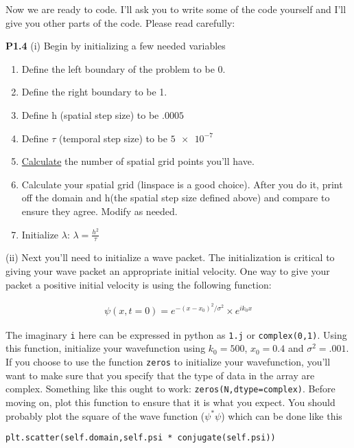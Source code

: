 Now we are ready to code.  I'll ask you to write some of the code
yourself and I'll give you other parts of the code. Please read
carefully:


\begin{minipage}{0.9\linewidth}
\noindent \textbf{P1.4} (i) Begin by initializing a few needed variables
\begin{enumerate}
\item Define the left boundary of the problem to be $0$.
\item Define the right boundary to be 1.
\item Define h (spatial step size) to be $.0005$
\item Define $\tau$ (temporal step size) to be $\num{5e-7}$
\item \underline{Calculate} the number of spatial grid points you'll
  have.
\item Calculate your spatial grid (linspace is a good choice). After
  you do it, print off the domain and h(the spatial step size defined
  above) and compare to ensure they agree.  Modify as needed.
\item Initialize $\lambda$: $\lambda = \frac{h^2}{\tau}$
\end{enumerate}
\vspace{0.1in}
(ii) Next you'll need to initialize a wave packet.  The initialization
is critical to giving your wave packet an appropriate initial
velocity.  One way to give your packet a positive initial velocity is
using the following function:

\begin{align}
\psi(x,t=0) = e^{-(x-x_0)^2/\sigma^2} \times e^{i k_0 x}
\end{align}

The imaginary \verb!i! here can be expressed in python as \verb!1.j!
or \verb!complex(0,1)!.  Using this function, initialize your
wavefunction using $k_0 = 500$, $x_0 = 0.4$ and $\sigma^2 = .001$. If
you choose to use the function \verb|zeros| to initialize your
wavefunction, you'll want to make sure that you specify that the type
of data in the array are complex.  Something like this ought to work:
\verb|zeros(N,dtype=complex)|.  Before moving on, plot this function
to ensure that it is what you expect. You should probably plot the
square of the wave function ($\psi^*\psi$) which can be done like this

\begin{verbatim}
plt.scatter(self.domain,self.psi * conjugate(self.psi))
\end{verbatim}            


\end{minipage}
